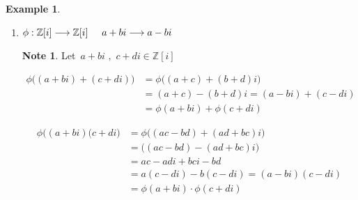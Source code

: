 \documentclass[11pt,a4paper]{article}
\theoremstyle{definition}
\newtheorem{exa}[thm]{Example}
\newtheorem*{note}{Note}
\begin{document}
\begin{exa}
\begin{enumerate}
\begin{align*}
\phi\big(f(x)\,g(x)\big) & = \phi \big[(a_0 + a_1x + a_2 x^2 + \cdots\cdots + a_n x^n)(b_0 + b_1x + b_2 x^2 + \cdots\cdots + b_n x^n)\big]\\
& = \phi\big(a_0b_0 + a_0b_1x + a_0b_2x^2 + \cdots\cdots + b_0a_2x + b_0a_2x^2 + \cdots\cdots\big)\\
& = (a_0\cdot b_0)\hspace{1cm} \boxed{\text{after}\hspace{0.2cm} \phi \hspace{0.2cm}\text{works on}\hspace{0.2cm} f(x)\, g(x)\hspace{0.3cm} x  = 0.\, \, \text{yielding}\hspace{0.2cm} a_0\cdot b_0}\\
& = (a_0)\cdot (b_0)\\
& = f(0)\cdot g(0)\\
& = \phi(f(x))\cdot \phi (g(x))\\
\end{align*}








\item $\phi : \mathbb{Z}[i] \longrightarrow \mathbb{Z}[i]\hspace{0.5cm} a + bi \longrightarrow a - bi$\\

\begin{note}
Let $\, a + b i\, \, , \, \, c + di \in \mathbb{Z}[i]$
\end{note}
\begin{align*}
\phi \big((a + bi) + (c + di)\big) & = \phi \big((a + c) + (b + d)i\big)\\
& = (a + c) - (b+d)i = (a - bi) + (c - di)\\
& = \phi (a + bi) + \phi (c + di)
\end{align*}

\begin{align*}
\phi\big((a+bi)(c+di\big) & = \phi\big((ac-bd) + (ad + bc)i\big)\\
& = \big((ac - bd) - (ad + bc)i\big)\\
& = ac - adi + bc i - bd\\
& = a(c - di) - b(c - di) = (a-bi)(c-di)\\
& = \phi(a + bi)\cdot \phi (c + di)\\\\
\end{align*}
\end{enumerate}
\end{exa}
\end{document}
